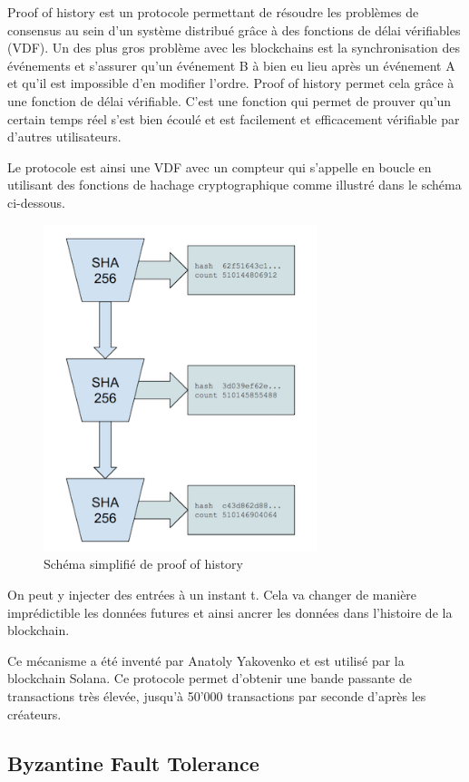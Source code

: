 Proof of history \cite{proof:poh} est un protocole permettant de résoudre les problèmes de consensus au sein d'un système distribué grâce à des fonctions de délai vérifiables (VDF). Un des plus gros problème avec les blockchains est la synchronisation des événements et s'assurer qu'un événement B à bien eu lieu après un événement A et qu'il est impossible d'en modifier l'ordre. Proof of history permet cela grâce à une fonction de délai vérifiable. C'est une fonction qui permet de prouver qu'un certain temps réel s'est bien écoulé et est facilement et efficacement vérifiable par d'autres utilisateurs.

Le protocole est ainsi une VDF avec un compteur qui s'appelle en boucle en utilisant des fonctions de hachage cryptographique comme illustré dans le schéma ci-dessous.

\begin{figure}[h!]
    \centering
    \includegraphics[width=8cm]{images/solana}
    \caption{Schéma simplifié de proof of history}
\end{figure}

On peut y injecter des entrées à un instant t. Cela va changer de manière imprédictible les données futures et ainsi ancrer les données dans l'histoire de la blockchain.

Ce mécanisme a été inventé par Anatoly Yakovenko et est utilisé par la blockchain Solana. Ce protocole permet d'obtenir une bande passante de transactions très élevée, jusqu'à 50'000 transactions par seconde d'après les créateurs.

\subsection{Byzantine Fault Tolerance}

